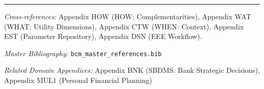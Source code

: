 
\vspace{1em}
\hrule
\vspace{0.5em}

\noindent\textit{Cross-references:}
Appendix HOW (HOW: Complementarities),
Appendix WAT (WHAT: Utility Dimensions),
Appendix CTW (WHEN: Context),
Appendix EST (Parameter Repository),
Appendix DSN (EEE Workflow).

\noindent\textit{Master Bibliography:} \texttt{bcm\_master\_references.bib}

\noindent\textit{Related Domain Appendices:} Appendix BNK (SBDMS: Bank Strategic Decisions), Appendix MUL1 (Personal Financial Planning)

